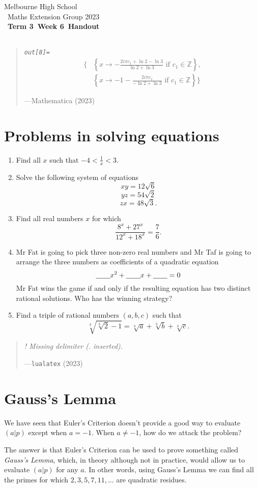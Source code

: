 \documentclass[a4paper]{article}
\title{{\thepdftitle}}
\author{Nathan Wong\and Tom Yan}
\date{2023}
\newcommand{\theterm}{3}
\newcommand{\theweek}{6}
\newcommand{\thedisplaytitle}{Term \theterm\ Week \theweek\ Handout}
\newcommand{\ileg}[2]{(#1|#2)}
\newcommand{\marginnote}[1]{\marginpar{\footnotesize{#1}}}
\let\mathbbalt\mathbb
\let\mathbb\mathbbalt
\newcommand{\integers}{\mathbb{Z}}
\newcommand{\myquote}[2]{%
  \begin{quote}
    \emph{#1}
    \begin{flushright}---{#2}
    \end{flushright}
  \end{quote}}
\begin{document}
\noindent Melbourne High School\\\
\noindent Maths Extension Group 2023\\\
\noindent \textbf{\thedisplaytitle}\\\
\myquote{%
	\textrm{\texttt{out[8]=}}
\[\begin{split}
	\biggl\{&\left\{x\to -\frac{2i\pi c_1+\ln2-\ln3}{\ln2+\ln3} \text{ if } c_1\in\integers\right\},\\
	&\left\{x\to -1-\frac{2i\pi c_1}{-\ln2+\ln3} \text { if } c_1\in\integers\right\}\biggl\}
	\end{split}
\]}{Mathematica (2023)}
\section*{Problems in solving equations}
\begin{enumerate}
\item Find all $x$ such that $-4 < \frac{1}{x} < 3$.  
\item Solve the following system of equations $$xy = 12\sqrt{6}$$ $$yz=54\sqrt{2}$$ $$zx=48\sqrt{3}. $$
\item Find all real numbers $x$ for which $$\frac{8^x+27^x}{12^x+18^x}=\frac{7}{6}. $$  
\item Mr \marginnote{USSR 1990} Fat is going to pick three non-zero real numbers and Mr Taf is going to arrange the three numbers as coefficients of a quadratic equation $$\underline{\hspace{0.7cm}}x^2 + \underline{\hspace{0.7cm}}x + \underline{\hspace{0.7cm}} = 0$$ Mr Fat wins the game if and only if the resulting equation has two distinct rational solutions. Who has the winning strategy?
\item Find \marginnote{ARML 1997} a triple of rational numbers $(a,b,c)$ such that $$\sqrt[3]{\sqrt[3]{2}-1} = \sqrt[3]{a} + \sqrt[3]{b} + \sqrt[3]{c}.$$
\end{enumerate}
\pagebreak
\myquote{! Missing delimiter (. inserted).}{\texttt{lualatex} (2023)}
\section*{Gauss's Lemma}
We have seen that Euler's Criterion doesn't provide 
a good way to evaluate \(\ileg{a}{p}\) except when
\(a=-1\). 
When \(a\not=-1\), how do we attack the problem?

The answer is that Euler's Criterion can be used
to prove something called \emph{Gauss's Lemma}, which,
in theory although not in practice, would allow
us to evaluate \(\ileg{a}{p}\) for any \(a\).
In other words, using Gauss's Lemma we can find all
the primes for which \(2,3,5,7,11,\ldots\) are quadratic
residues. 
\end{document}
